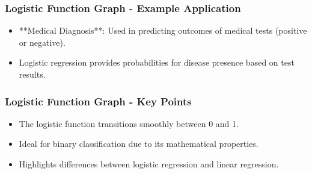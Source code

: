 \documentclass[aspectratio=169]{beamer}
\begin{document}
\begin{frame}[fragile]
    \frametitle{Logistic Function Graph - Example Application}
    \begin{itemize}
        \item **Medical Diagnosis**: Used in predicting outcomes of medical tests (positive or negative).
        \item Logistic regression provides probabilities for disease presence based on test results.
    \end{itemize}
\end{frame}

\begin{frame}[fragile]
    \frametitle{Logistic Function Graph - Key Points}
    \begin{itemize}
        \item The logistic function transitions smoothly between 0 and 1.
        \item Ideal for binary classification due to its mathematical properties.
        \item Highlights differences between logistic regression and linear regression.
    \end{itemize}
\end{frame}
\end{document}
